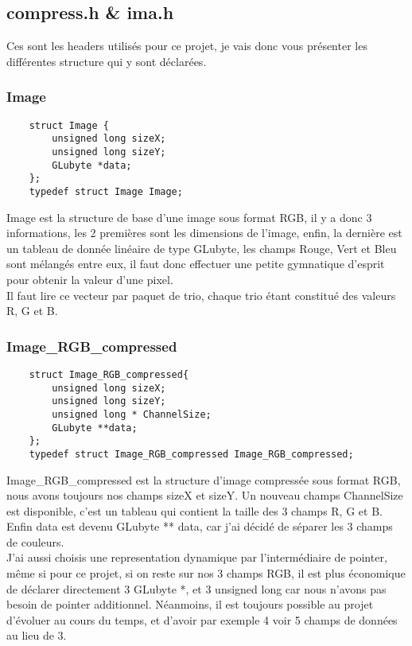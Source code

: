 \documentclass[12pt, letterpaper]{article}
\begin{document}
\subsection{compress.h  \& ima.h}
Ces sont les headers utilisés pour ce projet, je vais donc vous présenter les différentes structure qui y sont déclarées.
\subsubsection{Image}
\begin{verbatim}
    struct Image {
        unsigned long sizeX;
        unsigned long sizeY;
        GLubyte *data;
    };
    typedef struct Image Image;        
\end{verbatim}
Image est la structure de base d'une image sous format RGB, il y a donc 3 informations, les 2 premières sont les dimensions de l'image, 
enfin, la dernière est un tableau de donnée linéaire de type GLubyte, les champs Rouge, Vert et Bleu sont mélangés entre eux, 
il faut donc effectuer une petite gymnatique d'esprit pour obtenir la valeur d'une pixel.\\
Il faut lire ce vecteur par paquet de trio, chaque trio étant constitué des valeurs R, G et B.

\subsubsection{Image\_RGB\_compressed}
\begin{verbatim}
    struct Image_RGB_compressed{
        unsigned long sizeX;
        unsigned long sizeY;
        unsigned long * ChannelSize;
        GLubyte **data;
    };
    typedef struct Image_RGB_compressed Image_RGB_compressed;
\end{verbatim}
Image\_RGB\_compressed est la structure d'image compressée sous format RGB, nous avons toujours nos champs sizeX et sizeY. 
Un nouveau champs ChannelSize est disponible, c'est un tableau qui contient la taille des 3 champs R, G et B.\\
Enfin data est devenu GLubyte ** data, car j'ai décidé de séparer les 3 champs de couleurs. \\
J'ai aussi choisis une representation dynamique par l'intermédiaire de pointer, même si pour ce projet, si on reste sur nos 3 champs RGB, il est plus économique de 
déclarer directement 3 GLubyte *, et 3 unsigned long car nous n'avons pas besoin de pointer additionnel. Néanmoins, il est toujours possible au projet d'évoluer au cours du temps, 
et d'avoir par exemple 4 voir 5 champs de données au lieu de 3.
\end{document}
